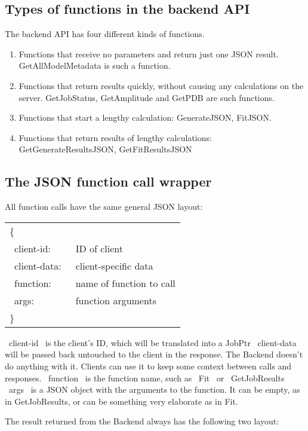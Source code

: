 \documentclass[12pt]{article}
\begin{document}
\subsection{Types of functions in the backend API}
The backend API has four different kinds of functions.
	\begin{enumerate}
		\item Functions that receive no parameters and return just one JSON result. GetAllModelMetadata is such a function.
		\item Functions that return results quickly, without causing any calculations on the server. GetJobStatus, GetAmplitude and GetPDB are such functions.
		\item Functions that start a lengthy calculation: GenerateJSON, FitJSON.
		\item Functions that return results of lengthy calculations: GetGenerateResultsJSON, GetFitResultsJSON
	\end{enumerate}

\subsection{The JSON function call wrapper}
All function calls have the same general JSON layout:

	\begin{tabular}{l l}
	
		\{ \\
		~client-id:~ & ID of client \\
		~client-data:~ &  client-specific data\\ 
		~function:~ & name of function to call\\ 
		~args:~ & function arguments\\
		\} 
	\end{tabular} 
	
~client-id~ is the client's ID, which will be translated into a JobPtr
~client-data~ will be passed back untouched to the client in the response. The Backend doesn't do anything with it. Clients can use it to keep some context between calls and responses. 
~function~ is the function name, such as ~Fit~ or ~GetJobResults~
~args~ is a JSON object with the arguments to the function. It can be empty, as in GetJobResults, or can be something very elaborate as in Fit.

The result returned from the Backend always has the following two layout:
\\
\end{document}
